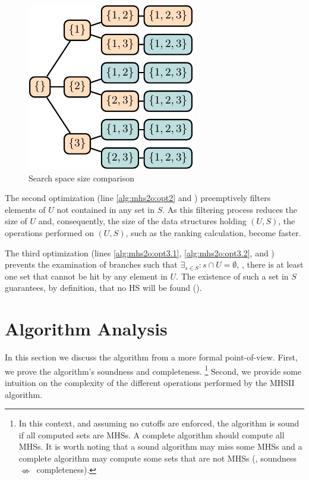 \begin{figure}[!ht]
  \includegraphics[width=0.8\columnwidth,page=3]{figures/mhs2/figures/opts/main}
  \caption{Search space size comparison\label{fig:mhs2o:search-space-comparison}}
\end{figure}

The second optimization (line \ref{alg:mhs2o:opt2} and
) preemptively filters elements of $U$
not contained in any set in $S$.
%
As this filtering process reduces the size of $U$ and, consequently,
the size of the data structures holding $(U,S)$, the operations
performed on $(U,S)$, such as the ranking calculation, become
faster.

The third optimization (lines \ref{alg:mhs2o:opt3.1},
\ref{alg:mhs2o:opt3.2}, and ) prevents
the examination of branches such that $\exists_{s \in S} : s \cap U =
\emptyset$, \ie, there is at least one set that cannot be hit by any
element in $U$.
%
The existence of such a set in $S$
guarantees, by definition, that no \ac{HS} will be found
().

\section{Algorithm Analysis}
\label{sec:mhs2o:analysis}
In this section we discuss the algorithm from a more formal point-of-view.
%
First, we prove the algorithm's soundness and completeness.%
\footnote{In this context, and assuming no cutoffs are enforced, the
  algorithm is sound if all computed sets are \acp{MHS}.
  A complete algorithm should compute all \acp{MHS}.
  It is worth noting that a sound algorithm may miss some \acp{MHS}
  and a complete algorithm may compute some sets that are not
  \acp{MHS} (\ie, soundness~$\nLeftrightarrow$~completeness).  }
%
Second, we provide some intuition on the complexity of the different
operations performed by the \ac{MHSII} algorithm.

